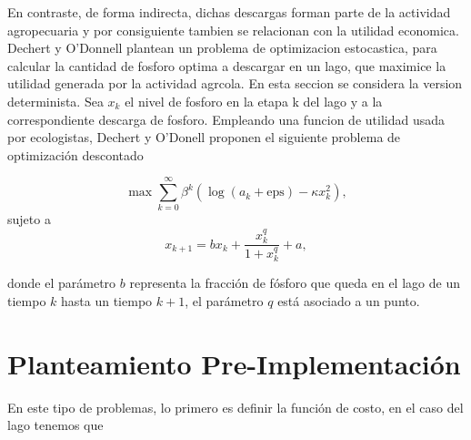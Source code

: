 \documentclass[oneside,spanish]{amsbook}
\numberwithin{section}{chapter}
\numberwithin{equation}{section}
\numberwithin{figure}{section}
\begin{document}
En contraste, de forma indirecta, dichas descargas forman parte de
la actividad agropecuaria y por consiguiente tambien se relacionan
con la utilidad economica. Dechert y O'Donnell plantean un problema
de optimizacion estocastica, para calcular la cantidad de fosforo
optima a descargar en un lago, que maximice la utilidad generada por
la actividad agrcola. En esta seccion se considera la version determinista.
Sea $x_{k}$ el nivel de fosforo en la etapa k del lago y a la correspondiente
descarga de fosforo. Empleando una funcion de utilidad usada por ecologistas,
Dechert y O'Donell proponen el siguiente problema de optimización
descontado 

\[
\max\sum_{k=0}^{\infty}\beta^{k}\left(\log\left(a_{k}+\text{eps}\right)-\kappa x_{k}^{2}\right),
\]
sujeto a 
\[
x_{k+1}=bx_{k}+\dfrac{x_{k}^{q}}{1+x_{k}^{q}}+a,
\]

donde el parámetro $b$ representa la fracción de fósforo que queda
en el lago de un tiempo $k$ hasta un tiempo $k+1$, el parámetro
$q$ está asociado a un punto.

\section{Planteamiento Pre-Implementación}

En este tipo de problemas, lo primero es definir la función de costo,
en el caso del lago tenemos que 
\end{document}
